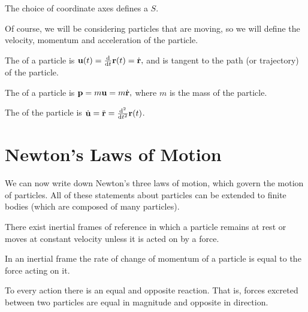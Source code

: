 \documentclass[a4paper]{scrreprt}
\begin{document}
The choice of coordinate axes defines a  $S$.

Of course, we will be considering particles that are moving, so we will define the velocity, momentum and acceleration of the particle.

\begin{definition}[Velocity]
	The  of a particle is
	$
	\mathbf{u}(t) = \frac{\mathrm{d}}{\mathrm{d}t} \mathbf{r}(t) = \dot{\mathbf{r}},
	$
	and is tangent to the path (or trajectory) of the particle.
\end{definition}

\begin{definition}[Momentum]
	The  of a particle is
	$
	\mathbf{p} = m \mathbf{u} = m \dot{\mathbf{r}},
	$
	where $m$ is the mass of the particle.
\end{definition}

\begin{definition}[Acceleration]
	The  of the particle is $\dot{\mathbf{u}} = \ddot{\mathbf{r}} = \frac{\mathrm{d}^2}{\mathrm{d}t^2} \mathbf{r}(t)$.
\end{definition}

\section{Newton's Laws of Motion}

We can now write down Newton's three laws of motion, which govern the motion of particles. All of these statements about particles can be extended to finite bodies (which are composed of many particles).

\begin{law*}
There exist inertial frames of reference in which a particle remains at rest or moves at constant velocity unless it is acted on by a force.
\end{law*}

\begin{law*}
	In an inertial frame the rate of change of momentum of a particle is equal to the force acting on it.
\end{law*}

\begin{law*}
To every action there is an equal and opposite reaction. That is, forces excreted between two particles are equal in magnitude and opposite in direction.
\end{law*}
\end{document}
